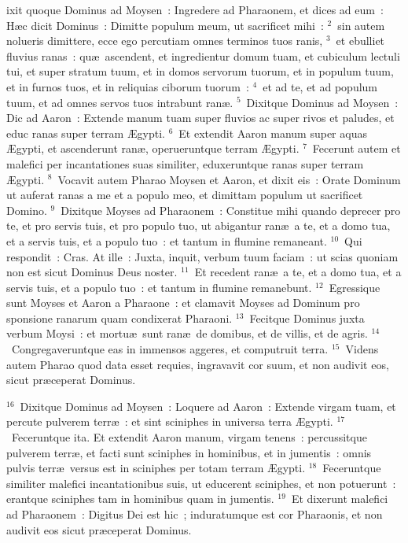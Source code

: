 \bchapter
{}ixit quoque Dominus ad Moysen~: Ingredere ad Pharaonem, et dices ad eum~: H\ae c dicit Dominus~: Dimitte populum meum, ut sacrificet mihi~:
${}^{2}$~sin autem nolueris dimittere, ecce ego percutiam omnes terminos tuos ranis,
${}^{3}$~et ebulliet fluvius ranas~: qu\ae\ ascendent, et ingredientur domum tuam, et cubiculum lectuli tui, et super stratum tuum, et in domos servorum tuorum, et in populum tuum, et in furnos tuos, et in reliquias ciborum tuorum~:
${}^{4}$~et ad te, et ad populum tuum, et ad omnes servos tuos intrabunt ran\ae .
${}^{5}$~Dixitque Dominus ad Moysen~: Dic ad Aaron~: Extende manum tuam super fluvios ac super rivos et paludes, et educ ranas super terram \AE gypti.
${}^{6}$~Et extendit Aaron manum super aquas \AE gypti, et ascenderunt ran\ae , operueruntque terram \AE gypti.
${}^{7}$~Fecerunt autem et malefici per incantationes suas similiter, eduxeruntque ranas super terram \AE gypti.
${}^{8}$~Vocavit autem Pharao Moysen et Aaron, et dixit eis~: Orate Dominum ut auferat ranas a me et a populo meo, et dimittam populum ut sacrificet Domino.
${}^{9}$~Dixitque Moyses ad Pharaonem~: Constitue mihi quando deprecer pro te, et pro servis tuis, et pro populo tuo, ut abigantur ran\ae\ a te, et a domo tua, et a servis tuis, et a populo tuo~: et tantum in flumine remaneant.
${}^{10}$~Qui respondit~: Cras. At ille~: Juxta, inquit, verbum tuum faciam~: ut scias quoniam non est sicut Dominus Deus noster.
${}^{11}$~Et recedent ran\ae\ a te, et a domo tua, et a servis tuis, et a populo tuo~: et tantum in flumine remanebunt.
${}^{12}$~Egressique sunt Moyses et Aaron a Pharaone~: et clamavit Moyses ad Dominum pro sponsione ranarum quam condixerat Pharaoni.
${}^{13}$~Fecitque Dominus juxta verbum Moysi~: et mortu\ae\ sunt ran\ae\ de domibus, et de villis, et de agris.
${}^{14}$~Congregaveruntque eas in immensos aggeres, et computruit terra.
${}^{15}$~Videns autem Pharao quod data esset requies, ingravavit cor suum, et non audivit eos, sicut pr\ae ceperat Dominus.


${}^{16}$~Dixitque Dominus ad Moysen~: Loquere ad Aaron~: Extende virgam tuam, et percute pulverem terr\ae~: et sint sciniphes in universa terra \AE gypti.
${}^{17}$~Feceruntque ita. Et extendit Aaron manum, virgam tenens~: percussitque pulverem terr\ae , et facti sunt sciniphes in hominibus, et in jumentis~: omnis pulvis terr\ae\ versus est in sciniphes per totam terram \AE gypti.
${}^{18}$~Feceruntque similiter malefici incantationibus suis, ut educerent sciniphes, et non potuerunt~: erantque sciniphes tam in hominibus quam in jumentis.
${}^{19}$~Et dixerunt malefici ad Pharaonem~: Digitus Dei est hic~; induratumque est cor Pharaonis, et non audivit eos sicut pr\ae ceperat Dominus.


